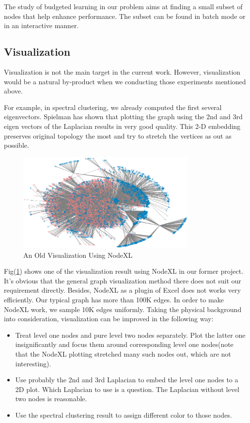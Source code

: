 \documentclass[11pt,a4paper]{article}
\begin{document}
The study of budgeted learning in our problem aims at finding a 
small subset of nodes that help enhance performance. 
The subset can be found in batch mode or in an interactive
manner. 

\subsection{Visualization}

Visualization is not the main target in the current work. 
However, visualization would be a natural by-product 
when we conducting those experiments mentioned above. 

For example, in spectral clustering, we already computed 
the first several eigenvectors. Spielman has shown that
\cite{spielman-2009spectral-ln} plotting the graph using 
the 2nd and 3rd eigen vectors of the Laplacian results 
in very good quality. This 2-D embedding preserves 
original topology the most and try to stretch the vertices 
as out as possible. 

\begin{figure}[htb]
	\centering
	\includegraphics[width=0.8\textwidth]{fig/old/sample1W_3.png}
	\caption{An Old Visualization Using NodeXL}
	\label{fig:vis_nodexl}
\end{figure}

Fig(\ref{fig:vis_nodexl}) shows one of the visualization result
using NodeXL in our former project. It's obvious that the general 
graph visualization method there does not suit our requirement 
directly. Besides, NodeXL as a plugin of Excel does not 
works very efficiently. Our typical graph has more than 100K edges. 
In order to make NodeXL work, we sample 10K edges uniformly. 
Taking the physical background into consideration, visualization can 
be improved in the following way:
\begin{itemize}
	\item Treat level one nodes and pure level two nodes separately. 
	Plot the latter one insignificantly and focus them around corresponding
	level one nodes(note that the NodeXL plotting stretched many such nodes
	out, which are not interesting).
	\item Use probably the 2nd and 3rd Laplacian to embed the level one nodes to 
	a 2D plot. Which Laplacian to use is a question. 
	The Laplacian without level two nodes is reasonable. 
	\item Use the spectral clustering result to assign different color 
	to those nodes. 
\end{itemize}
\end{document}
